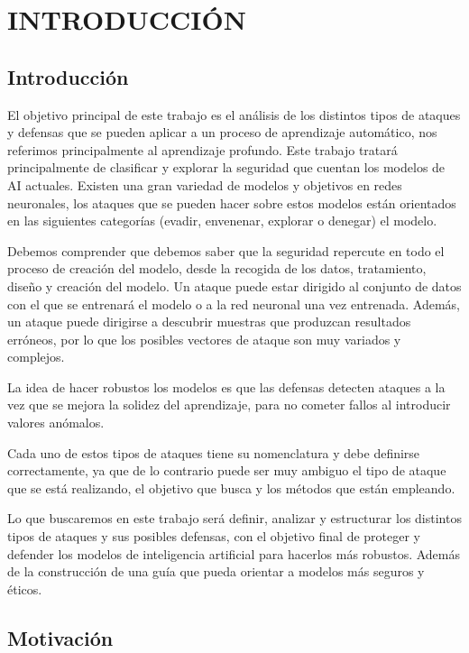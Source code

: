 \chapter{INTRODUCCIÓN}
\label{ch:1}

\section{Introducción}

El objetivo principal de este trabajo es el análisis de los distintos tipos de ataques y defensas que se pueden aplicar a un proceso de aprendizaje automático, nos referimos principalmente al aprendizaje profundo.
Este trabajo tratará principalmente de clasificar y explorar la seguridad que cuentan los modelos de \gls{AI} actuales.
Existen una gran variedad de modelos y objetivos en redes neuronales, los ataques que se pueden hacer sobre estos modelos están orientados en las siguientes categorías (evadir, envenenar, explorar o denegar) el modelo.

Debemos comprender que debemos saber que la seguridad repercute en todo el proceso de creación del modelo, desde la recogida de los datos, tratamiento, diseño y creación del modelo.
Un ataque puede estar dirigido al conjunto de datos con el que se entrenará el modelo o a la red neuronal una vez entrenada.
Además, un ataque puede dirigirse a descubrir muestras que produzcan resultados erróneos, por lo que los posibles vectores de ataque son muy variados y complejos.

La idea de hacer robustos los modelos es que las defensas detecten ataques a la vez que se mejora la solidez del aprendizaje, para no cometer fallos al introducir valores anómalos.

Cada uno de estos tipos de ataques tiene su nomenclatura y debe definirse correctamente, ya que de lo contrario puede ser muy ambiguo el tipo de ataque que se está realizando, el objetivo que busca y los métodos que están empleando.

Lo que buscaremos en este trabajo será definir, analizar y estructurar los distintos tipos de ataques y sus posibles defensas, con el objetivo final de proteger y defender los modelos de inteligencia artificial para hacerlos más robustos.
Además de la construcción de una guía que pueda orientar a modelos más seguros y éticos.


\section{Motivación}

